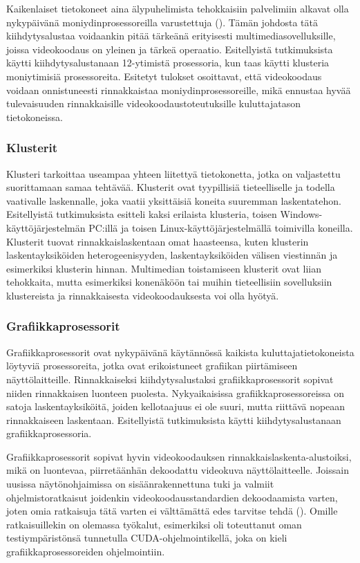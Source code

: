 Kaikenlaiset tietokoneet aina älypuhelimista tehokkaisiin palvelimiin alkavat
olla nykypäivänä moniydinprosessoreilla varustettuja (\citealt{choi}). Tämän
johdosta tätä kiihdytysalustaa voidaankin pitää tärkeänä erityisesti
multimediasovelluksille, joissa videokoodaus on yleinen ja tärkeä operaatio.
Esitellyistä tutkimuksista \citealt{chi} käytti kiihdytysalustanaan 12-ytimistä
prosessoria, kun taas \citealt{li} käytti klusteria moniytimisiä prosessoreita.
Esitetyt tulokset osoittavat, että videokoodaus voidaan onnistuneesti
rinnakkaistaa moniydinprosessoreille, mikä ennustaa hyvää tulevaisuuden
rinnakkaisille videokoodaustoteutuksille kuluttajatason tietokoneissa.

\subsubsection{Klusterit}

Klusteri tarkoittaa useampaa yhteen liitettyä tietokonetta, jotka on valjastettu
suorittamaan samaa tehtävää. Klusterit ovat tyypillisiä tieteelliselle ja
todella vaativalle laskennalle, joka vaatii yksittäisiä koneita suuremman 
laskentatehon. Esitellyistä tutkimuksista \citealt{li} esitteli kaksi erilaista
klusteria, toisen Windows-käyttöjärjestelmän PC:illä ja toisen
Linux-käyttöjärjestelmällä toimivilla koneilla. Klusterit tuovat 
rinnakkaislaskentaan omat haasteensa, kuten klusterin laskentayksiköiden
heterogeenisyyden, laskentayksiköiden välisen viestinnän ja esimerkiksi
klusterin hinnan. Multimedian toistamiseen klusterit ovat liian tehokkaita,
mutta esimerkiksi konenäköön tai muihin tieteellisiin sovelluksiin klustereista
ja rinnakkaisesta videokoodauksesta voi olla hyötyä.

\subsubsection{Grafiikkaprosessorit}

Grafiikkaprosessorit ovat nykypäivänä käytännössä kaikista
kuluttajatietokoneista löytyviä prosessoreita, jotka ovat erikoistuneet
grafiikan piirtämiseen näyttölaitteille. Rinnakkaiseksi kiihdytysalustaksi
grafiikkaprosessorit sopivat niiden rinnakkaisen luonteen puolesta.
Nykyaikaisissa grafiikkaprosessoreissa on satoja laskentayksiköitä, joiden
kellotaajuus ei ole suuri, mutta riittävä nopeaan rinnakkaiseen laskentaan.
Esitellyistä tutkimuksista \citealt{pieters} käytti kiihdytysalustanaan
grafiikkaprosessoria.

Grafiikkaprosessorit sopivat hyvin videokoodauksen
rinnakkaislaskenta-alustoiksi, mikä on luontevaa, piirretäänhän dekoodattu
videokuva näyttölaitteelle. Joissain uusissa näytönohjaimissa on
sisäänrakennettuna tuki ja valmiit ohjelmistoratkaisut joidenkin videokoodausstandardien dekoodaamista
varten, joten omia ratkaisuja tätä varten ei välttämättä edes tarvitse tehdä (\citealt{nvidia}).
Omille ratkaisuillekin on olemassa työkalut, esimerkiksi \citealt{pieters}
oli toteuttanut oman testiympäristönsä tunnetulla CUDA-ohjelmointikellä, joka
on kieli grafiikkaprosessoreiden ohjelmointiin.


